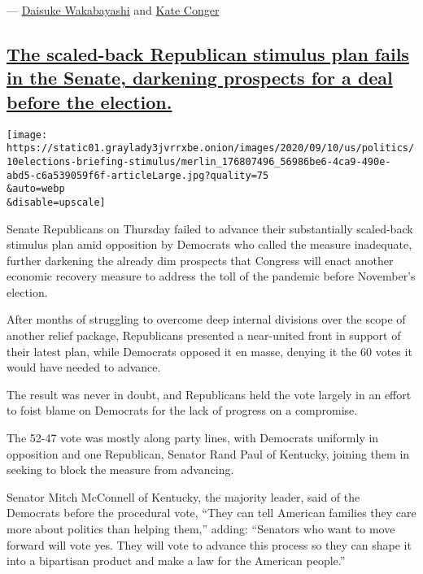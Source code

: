 ---
\href{https://www.nytimes3xbfgragh.onion/by/daisuke-wakabayashi}{Daisuke
Wakabayashi} and
\href{https://www.nytimes3xbfgragh.onion/by/kate-conger}{Kate Conger}

\hypertarget{the-scaled-back-republican-stimulus-plan-fails-in-the-senate-darkening-prospects-for-a-deal-before-the-election}{%
\subsection{\texorpdfstring{\protect\hyperlink{the-scaled-back-republican-stimulus-plan-fails-in-the-senate-darkening-prospects-for-a-deal-before-the-election}{The
scaled-back Republican stimulus plan fails in the Senate, darkening
prospects for a deal before the
election.}}{The scaled-back Republican stimulus plan fails in the Senate, darkening prospects for a deal before the election.}}\label{the-scaled-back-republican-stimulus-plan-fails-in-the-senate-darkening-prospects-for-a-deal-before-the-election}}

\texttt{[image: https://static01.graylady3jvrrxbe.onion/images/2020/09/10/us/politics/10elections-briefing-stimulus/merlin\_176807496\_56986be6-4ca9-490e-abd5-c6a539059f6f-articleLarge.jpg?quality=75\\\&auto=webp\\\&disable=upscale]}

Senate Republicans on Thursday failed to advance their substantially
scaled-back stimulus plan amid opposition by Democrats who called the
measure inadequate, further darkening the already dim prospects that
Congress will enact another economic recovery measure to address the
toll of the pandemic before November's election.

After months of struggling to overcome deep internal divisions over the
scope of another relief package, Republicans presented a near-united
front in support of their latest plan, while Democrats opposed it en
masse, denying it the 60 votes it would have needed to advance.

The result was never in doubt, and Republicans held the vote largely in
an effort to foist blame on Democrats for the lack of progress on a
compromise.

The 52-47 vote was mostly along party lines, with Democrats uniformly in
opposition and one Republican, Senator Rand Paul of Kentucky, joining
them in seeking to block the measure from advancing.

Senator Mitch McConnell of Kentucky, the majority leader, said of the
Democrats before the procedural vote, ``They can tell American families
they care more about politics than helping them,'' adding: ``Senators
who want to move forward will vote yes. They will vote to advance this
process so they can shape it into a bipartisan product and make a law
for the American people.''


